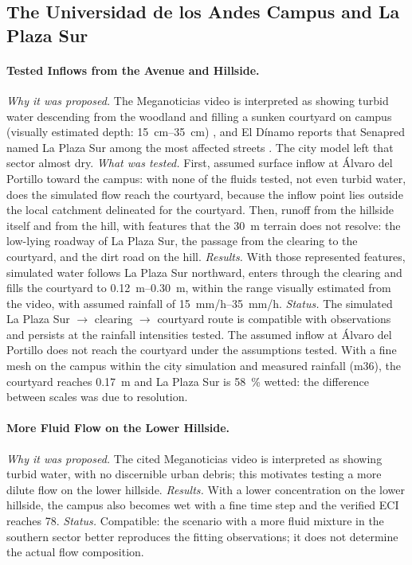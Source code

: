 \subsection{The Universidad de los Andes Campus and La Plaza Sur}
\paragraph{Tested Inflows from the Avenue and Hillside.} \emph{Why it was proposed.} The Meganoticias video is interpreted as showing turbid water descending from the woodland and filling a sunken courtyard on campus (visually estimated depth: \SIrange{15}{35}{cm}) \citep{meganoticias2026uandes}, and El Dínamo reports that Senapred named La Plaza Sur among the most affected streets \citep{eldinamo2026}. The city model left that sector almost dry. \emph{What was tested.} First, assumed surface inflow at Álvaro del Portillo toward the campus: with none of the fluids tested, not even turbid water, does the simulated flow reach the courtyard, because the inflow point lies outside the local catchment delineated for the courtyard. Then, runoff from the hillside itself and from the hill, with features that the \SI{30}{m} terrain does not resolve: the low-lying roadway of La Plaza Sur, the passage from the clearing to the courtyard, and the dirt road on the hill. \emph{Results.} With those represented features, simulated water follows La Plaza Sur northward, enters through the clearing and fills the courtyard to \SIrange{0.12}{0.30}{m}, within the range visually estimated from the video, with assumed rainfall of \SIrange{15}{35}{mm/h}. \emph{Status.} The simulated La Plaza Sur $\rightarrow$ clearing $\rightarrow$ courtyard route is compatible with observations and persists at the rainfall intensities tested. The assumed inflow at Álvaro del Portillo does not reach the courtyard under the assumptions tested. With a fine mesh on the campus within the city simulation and measured rainfall (m36), the courtyard reaches \SI{0.17}{m} and La Plaza Sur is \SI{58}{\percent} wetted: the difference between scales was due to resolution.

\paragraph{More Fluid Flow on the Lower Hillside.} \emph{Why it was proposed.} The cited Meganoticias video is interpreted as showing turbid water, with no discernible urban debris; this motivates testing a more dilute flow on the lower hillside. \emph{Results.} With a lower concentration on the lower hillside, the campus also becomes wet with a fine time step and the verified ECI reaches 78. \emph{Status.} Compatible: the scenario with a more fluid mixture in the southern sector better reproduces the fitting observations; it does not determine the actual flow composition.

